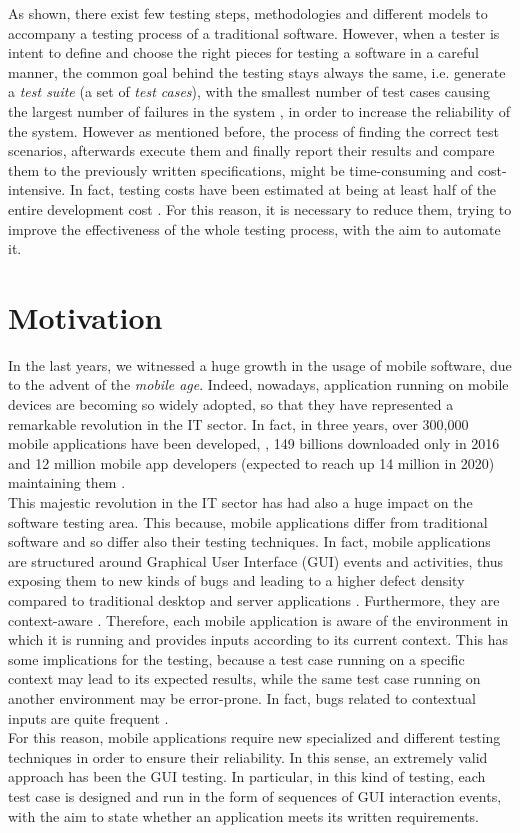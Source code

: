 As shown, there exist few testing steps, methodologies and different models to accompany a testing process of a traditional software. However, when a tester is intent to define and choose the right pieces for testing a software in a careful manner, the common goal behind the testing stays always the same, i.e. generate a \textit{test suite} (a set of \textit{test cases}), with the smallest number of test cases causing the largest number of failures in the system \cite{grano}, in order to increase the reliability of the system. 
However as mentioned before, the process of finding the correct test scenarios, afterwards execute them and finally report their results and compare them to the previously written specifications, might be time-consuming and cost-intensive. In fact, testing costs have been estimated at being at least half of the entire development cost \cite{Beizer:1990:STT:79060}. For this reason, it is necessary to reduce them, trying to improve the effectiveness of the whole testing process, with the aim to automate it. 

\section{Motivation}
In the last years, we witnessed a huge growth in the usage of mobile software, due to the advent of the \textit{mobile age}. Indeed, nowadays, application running on mobile devices are becoming so widely adopted, so that they have represented a remarkable revolution in the IT sector. In fact, in three years, over 300,000 mobile applications have been developed, \cite{muccini}, 149 billions downloaded only in 2016 \cite{statista} and 12 million mobile app developers (expected to reach up 14 million in 2020) maintaining them \cite{DevRelate}. \\
This majestic revolution in the IT sector has had also a huge impact on the software testing area. This because, mobile applications differ from traditional software and so differ also their testing techniques. 
In fact, mobile applications are structured around Graphical User Interface (GUI) events and activities, thus exposing them to new kinds of bugs and leading to a higher defect density compared to traditional desktop and server applications \cite{Hu:2011:AGT:1982595.1982612}. Furthermore, they are context-aware \cite{muccini}. 
Therefore, each mobile application is aware of the environment in which it is running and provides inputs according to its current context. This has some implications for the testing, because a test case running on a specific context may lead to its expected results, while the same test case running on another environment may be error-prone. In fact, bugs related to contextual inputs are quite frequent \cite{muccini}. \\
For this reason, mobile applications require new specialized and different testing techniques \cite{muccini} in order to ensure their reliability. In this sense, an extremely valid approach has been the GUI testing. In particular, in this kind of testing, each test case is designed and run in the form of sequences of GUI interaction events, with the aim to state whether an application meets its written requirements. 

